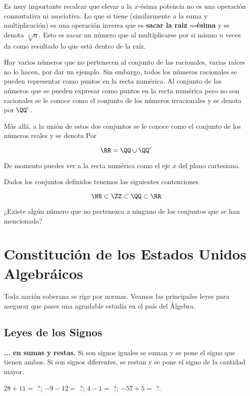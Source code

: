 Es muy importante recalcar que elevar a la $x$-ésima potencia  
no es una operación conmutativa ni asociativa. 
Lo que si tiene (similarmente a la suma y multiplicación) es 
una operación inversa que es \textbf{sacar la raiz $n$-ésima} 
y se denota $\sqrt[x]{a}$. 
Esto es sacar un número que al multiplicarse por si mismo $n$ 
veces da como resultado lo que está dentro de la raíz. 

Hay varios números que no pertenecen al conjunto de las 
racionales, varias raíces no lo hacen, por dar un ejemplo. 
Sin embargo, todos los números racionales se pueden 
representar como puntos en la recta numérica. Al 
conjunto de los números que se pueden expresar como puntos en 
la recta numérica pero no son racionales se le conoce como el 
conjunto de los números irracionales y se denota por $\QQ^c$.

Más allá, a la unión de estos dos conjuntos se le conoce como 
el conjunto de los números reales y se denota Por

\[\RR = \QQ \cup \QQ^c\]

De momento puedes ver a la recta numérica como el eje $x$ del 
plano cartesiano.

Dados los conjuntos definidos tenemos las siguientes contenciones 

\[\NN \subset \ZZ \subset \QQ \subset \RR\]

\begin{question}
¿Existe algún número que no pertenezca a ninguno de los 
conjuntos que se han mencionado?
\end{question}

\section{Constitución de los Estados Unidos Algebráicos}

Toda nación soberana se rige por normas. Veamos las principales 
leyes para asegurar que pases una agradable estadía en el 
país del Álgebra.

\subsection{Leyes de los Signos}

\textbf{... en sumas y restas.} Si son signos iguales se suman 
y se pone el signo que tienen ambos. Si son signos diferentes, 
se restan y se pone el signo de la cantidad mayor.

\begin{example}
    $28+11 =$ ?;
    $-9-12 =$ ?;
    $4-1 =$ ?;
    $-57+5 =$ ?.
\end{example}

